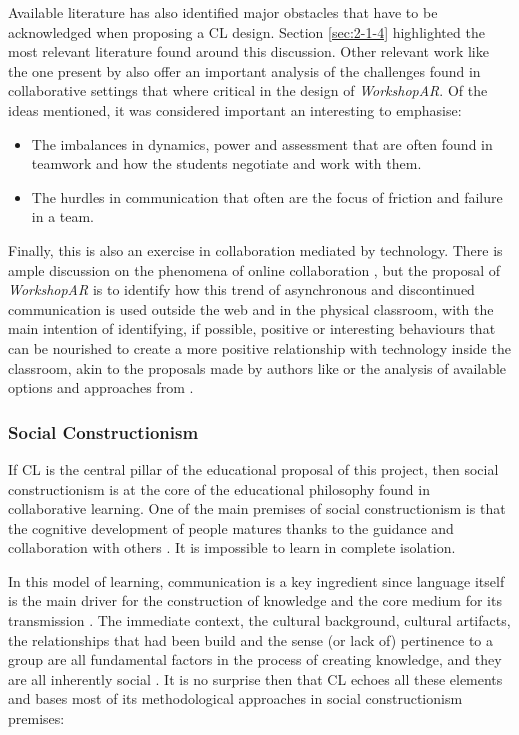 Available literature has also identified major obstacles that have to be acknowledged when proposing a \ac{CL} design. Section \ref{sec:2-1-4} highlighted the most
relevant literature found around this discussion. Other relevant work like the one present by \textcite{hansen_2006,pfaff_2003} also offer an important analysis of the
challenges found in collaborative settings that where critical in the design of \emph{WorkshopAR}. Of the ideas mentioned, it was considered important an interesting to emphasise:

\begin{itemize}
    \item The imbalances in dynamics, power and assessment that are often found in teamwork and how the students negotiate and work with them.
    \item The hurdles in communication that often are the focus of friction and failure in a team.
\end{itemize}

Finally, this is also an exercise in collaboration mediated by technology. There is ample discussion on the phenomena of online collaboration \parencite{hathorn_2002,rodchua_2017},
but the proposal of \emph{WorkshopAR} is to identify how this trend of asynchronous and discontinued communication is used outside the web and in the physical classroom, with the
main intention of identifying, if possible, positive or interesting behaviours that can be nourished to create a more positive relationship with technology inside the
classroom, akin to the proposals made by authors like \textcite{dyer_2015} or the analysis of available options and approaches from \textcite{olson_2012}.

\subsubsection{Social Constructionism \label{sec:3-3-1-2}}

If \ac{CL} is the central pillar of the educational proposal of this project, then social constructionism is at the core of the educational philosophy found in
collaborative learning. One of the main premises of social constructionism is that the cognitive development of people matures thanks to the guidance and collaboration
with others \parencite{rogoff_1990}. It is impossible to learn in complete isolation.

In this model of learning, communication is a key ingredient since language itself is the main driver for the construction of knowledge and the core medium for its
transmission \parencite{renzl_2007}. The immediate context, the cultural background, cultural artifacts, the relationships that had been build and the sense (or lack of)
pertinence to a group are all fundamental factors in the process of creating knowledge, and they are all inherently social \parencite{edley_2001,burr_2017}. It is no
surprise then that \ac{CL} echoes all these elements and bases most of its methodological approaches in social constructionism premises:

